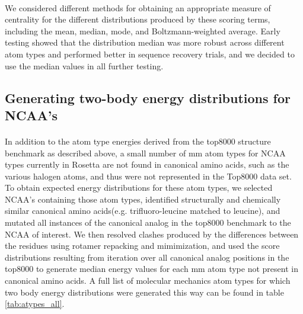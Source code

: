 \paragraph{}
We considered different methods for obtaining an appropriate measure of centrality for the different distributions produced by these scoring terms, including the mean, median, mode, and Boltzmann-weighted average.
Early testing showed that the distribution median was more robust across different atom types and performed better in sequence recovery trials, and we decided to use the median values in all further testing.


\subsection{Generating two-body energy distributions for NCAA's} 
\paragraph{}
In addition to the atom type energies derived from the top8000 structure benchmark as described above, a small number of mm atom types for NCAA types currently in Rosetta are not found in canonical amino acids, such as the various halogen atoms, and thus were not represented in the Top8000 data set.
To obtain expected energy distributions for these atom types, we selected NCAA's containing those atom types, identified structurally and chemically similar canonical amino acids(e.g. trifluoro-leucine matched to leucine), and mutated all instances of the canonical analog in the top8000 benchmark to the NCAA of interest.
We then resolved clashes produced by the differences between the residues using rotamer repacking and mimimization, and used the score distributions resulting from iteration over all canonical analog positions in the top8000 to generate median energy values for each mm atom type not present in canonical amino acids.
A full list of molecular mechanics atom types for which two body energy distributions were generated this way can be found in table \ref{tab:atypes_all}.


